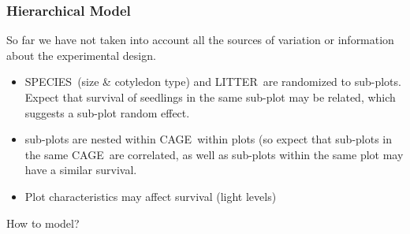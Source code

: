 \documentclass[handout]{beamer}\usepackage[]{graphicx}\usepackage[]{color}
\def\C{\textsf{CAGE}}
\def\Li{\textsf{LITTER}}
\def\V{\textsf{SPECIES}}
\begin{document}
\begin{frame}\frametitle{Hierarchical Model}

So far we have not taken into account all the sources of variation or
information about the experimental design.
\pause
\begin{itemize}
\item
\V\ (size \& cotyledon type) and \Li\ are  randomized to sub-plots.
Expect that survival of seedlings in the same sub-plot may be related,
which suggests a sub-plot random effect.
\pause
\item sub-plots are nested within \C\ within plots (so expect that
  sub-plots in the same \C\ are correlated, as well as sub-plots within the same plot may have a similar survival.
\pause
\item Plot  characteristics may affect survival (light levels)
\pause
\end{itemize}

How to model?



\end{frame}
\end{document}
